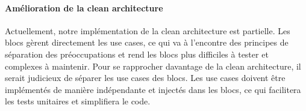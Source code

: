 \paragraph{Amélioration de la clean architecture}
Actuellement, notre implémentation de la clean architecture est partielle. Les blocs gèrent directement les use cases, ce qui va à l'encontre des principes de séparation des préoccupations et rend les blocs plus difficiles à tester et complexes à maintenir. Pour se rapprocher davantage de la clean architecture, il serait judicieux de séparer les use cases des blocs. Les use cases doivent être implémentés de manière indépendante et injectés dans les blocs, ce qui facilitera les tests unitaires et simplifiera le code.

